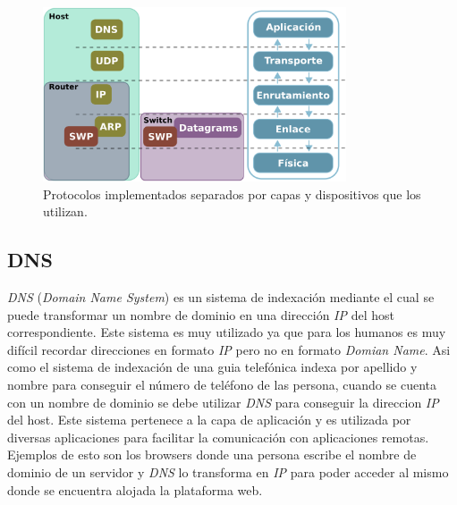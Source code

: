 \documentclass[10pt,a4paper]{article}
\begin{document}
\begin{figure}[!htb]
    \centering
    \includegraphics[width = 0.8\textwidth]{img/png/protocols.png}
    \caption{Protocolos implementados separados por capas y dispositivos que los utilizan.}
    \label{figure: protocolos}
\end{figure}
	
\subsection{DNS}
\textit{DNS} (\textit{Domain Name System}) es un sistema de indexación mediante el cual se puede transformar un nombre de dominio en una dirección \textit{IP} del host correspondiente. Este sistema es muy utilizado ya que para los humanos es muy difícil recordar direcciones en formato \textit{IP} pero no en formato \textit{Domian Name}. Asi como el sistema de indexación de una guia telefónica indexa por apellido y nombre para conseguir el número de teléfono de las persona, cuando se cuenta con un nombre de dominio se debe utilizar \textit{DNS} para conseguir la direccion \textit{IP} del host. Este sistema pertenece a la capa de aplicación y es utilizada por diversas aplicaciones para facilitar la comunicación con aplicaciones remotas. Ejemplos de esto son los browsers donde una persona escribe el nombre de dominio de un servidor y \textit{DNS} lo transforma en \textit{IP} para poder acceder al mismo donde se encuentra alojada la plataforma web. 
\end{document}
